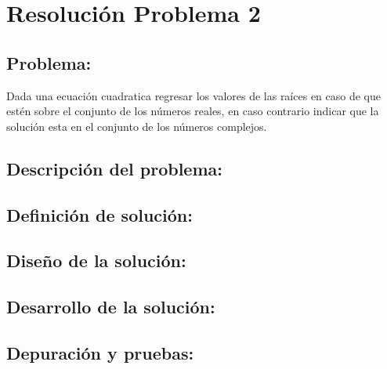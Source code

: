 \section{Resolución Problema 2} 
\subsection{Problema:}
Dada una ecuación cuadratica regresar los valores de las raíces en caso de que estén sobre el conjunto de los números reales, en caso contrario indicar que la solución esta en el conjunto de los números complejos. 

\subsection{\textbf{Descripción del problema:}}

\subsection{\textbf{Definición de solución:}}

\subsection{\textbf{Diseño de la solución:}}

\subsection{\textbf{Desarrollo de la solución:}}

\subsection{\textbf{Depuración y pruebas:}}